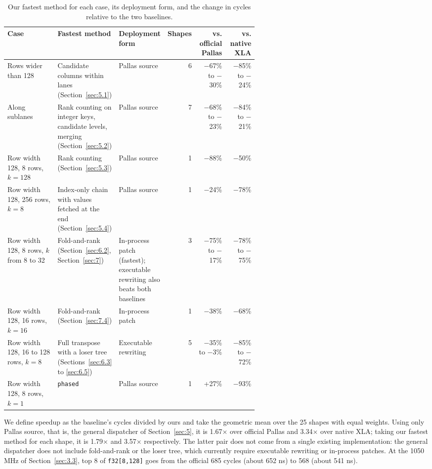 \documentclass[sigconf,nonacm,balance=false]{acmart}
\newcommand{\code}[1]{\texttt{#1}}
\begin{document}
\begin{table}
\centering
\caption{Our fastest method for each case, its deployment form, and the change in cycles relative to the two baselines.}
\label{tab:18}
\begin{tabular}{>{\raggedright\arraybackslash}p{0.20\linewidth}>{\raggedright\arraybackslash}p{0.21\linewidth}>{\raggedright\arraybackslash}p{0.18\linewidth}rrr}
\toprule
Case & Fastest method & Deployment form & Shapes & \makecell[rb]{vs. official\\Pallas} & vs. native XLA \\
\midrule
Rows wider than 128 & Candidate columns within lanes (Section~\ref{sec:5.1}) & Pallas source & 6 & $-$67\% to $-$30\% & $-$85\% to $-$24\% \\
Along sublanes & Rank counting on integer keys, candidate levels, merging (Section~\ref{sec:5.2}) & Pallas source & 7 & $-$68\% to $-$23\% & $-$84\% to $-$21\% \\
Row width 128, 8 rows, $k = 128$ & Rank counting (Section~\ref{sec:5.3}) & Pallas source & 1 & $-$88\% & $-$50\% \\
Row width 128, 256 rows, $k = 8$ & Index-only chain with values fetched at the end (Section~\ref{sec:5.4}) & Pallas source & 1 & $-$24\% & $-$78\% \\
Row width 128, 8 rows, $k$ from 8 to 32 & Fold-and-rank (Section~\ref{sec:6.2}, Section~\ref{sec:7}) & In-process patch (fastest); executable rewriting also beats both baselines & 3 & $-$75\% to $-$17\% & $-$78\% to $-$75\% \\
Row width 128, 16 rows, $k = 16$ & Fold-and-rank (Section~\ref{sec:7.4}) & In-process patch & 1 & $-$38\% & $-$68\% \\
Row width 128, 16 to 128 rows, $k = 8$ & Full transpose with a loser tree (Sections~\ref{sec:6.3} to \ref{sec:6.5}) & Executable rewriting & 5 & $-$35\% to $-$3\% & $-$85\% to $-$72\% \\
Row width 128, 8 rows, $k = 1$ & \code{phased} & Pallas source & 1 & +27\% & $-$93\% \\
\bottomrule
\end{tabular}
\end{table}

We define speedup as the baseline's cycles divided by ours and take the geometric mean over the 25 shapes with equal weights. Using only Pallas source, that is, the general dispatcher of Section~\ref{sec:5}, it is 1.67$\times$ over official Pallas and 3.34$\times$ over native XLA; taking our fastest method for each shape, it is 1.79$\times$ and 3.57$\times$ respectively. The latter pair does not come from a single existing implementation: the general dispatcher does not include fold-and-rank or the loser tree, which currently require executable rewriting or in-process patches. At the 1050 MHz of Section~\ref{sec:3.3}, top 8 of \code{f32[8,\allowbreak{}128]} goes from the official 685 cycles (about 652 ns) to 568 (about 541 ns).
\end{document}
